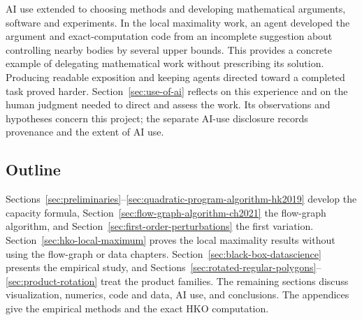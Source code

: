 AI use extended to choosing methods and developing mathematical arguments,
software and experiments. In the local maximality work, an agent developed
the argument and exact-computation code from an incomplete suggestion about
controlling nearby bodies by several upper bounds. This provides a
concrete example of delegating mathematical work without prescribing its
solution. Producing readable exposition and keeping agents directed toward
a completed task proved harder. Section~\ref{sec:use-of-ai} reflects on
this experience and on the human judgment needed to direct and assess the
work. Its observations and hypotheses concern this project; the separate
AI-use disclosure records provenance and the extent of AI use.

\subsection{Outline}

Sections~\ref{sec:preliminaries}--\ref{sec:quadratic-program-algorithm-hk2019}
develop the capacity formula, Section~\ref{sec:flow-graph-algorithm-ch2021}
the flow-graph algorithm, and Section~\ref{sec:first-order-perturbations}
the first variation. Section~\ref{sec:hko-local-maximum} proves the local
maximality results without using the flow-graph or data chapters.
Section~\ref{sec:black-box-datascience} presents the empirical study, and
Sections~\ref{sec:rotated-regular-polygons}--\ref{sec:product-rotation}
treat the product families. The remaining sections discuss visualization,
numerics, code and data, AI use, and conclusions. The appendices give
the empirical methods and the exact HKO computation.
